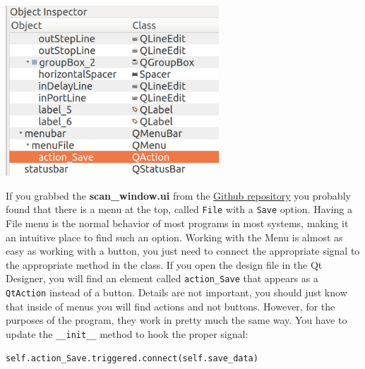 
\begin{center}
\includegraphics[width=0.6\textwidth]{images/save_menu.png}
\end{center}

If you grabbed the \textbf{scan\_window.ui} from the
\href{https://github.com/PFTL/SimpleDaq/tree/master/PythonForTheLab/View/GUI}{Github
repository} you probably found that there is a menu at the top, called
\texttt{File} with a \texttt{Save} option. Having a File menu is the
normal behavior of most programs in most systems, making it an intuitive
place to find such an option. Working with the Menu is almost as easy as
working with a button, you just need to connect the appropriate signal
to the appropriate method in the class. If you open the design file in
the Qt Designer, you will find an element called \texttt{action_Save}
that appears as a \texttt{QtAction} instead of a button. Details are not
important, you should just know that inside of menus you will find
actions and not buttons. However, for the purposes of the program, they
work in pretty much the same way. You have to update the
\texttt{__init__} method to hook the proper signal:

\begin{verbatim}
self.action_Save.triggered.connect(self.save_data)
\end{verbatim}

